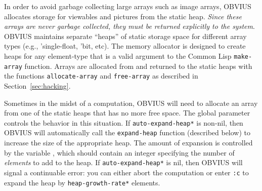 In order to avoid garbage collecting large arrays such as image
arrays, OBVIUS allocates storage for viewables and pictures from the
static heap.  {\em Since these arrays are never garbage collected,
they must be returned explicitly to the system}.  OBVIUS maintains
separate ``heaps'' of static storage space for different array types
(e.g., 'single-float, 'bit, etc).  The memory allocator is designed to
create heaps for any element-type that is a valid argument to the
Common Lisp {\tt make-array} function.  Arrays are allocated from and
returned to the static heaps with the functions {\tt allocate-array}
and {\tt free-array} as described in Section~\ref{sec:hacking}.

Sometimes in the midst of a computation, OBVIUS will need to allocate
an array from one of the static heaps that has no more free space.
The global parameter  controls the behavior in
this situation.  If {\tt *auto-expand-heap*} is non-nil, then OBVIUS
will automatically call the {\tt expand-heap} function (described
below) to increase the size of the appropriate heap.  The amount of expansion is
controlled by the variable , which should
contain an integer specifying the number of {\em elements} to add to
the heap.  If {\tt *auto-expand-heap*} is nil, then OBVIUS will signal
a continuable error: you can either abort the computation or enter
{\tt :c} to expand the heap by {\tt *heap-growth-rate*} elements.

